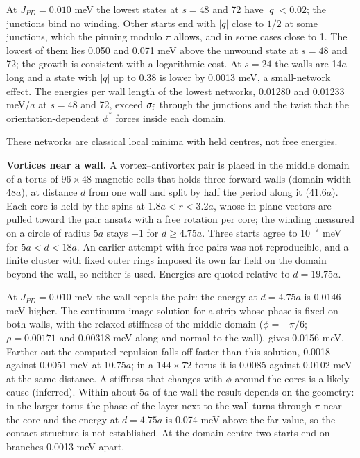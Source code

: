 At \(J_{PD}=0.010\) meV the lowest states at \(s=48\) and 72 have
\(|q|<0.02\); the junctions bind no winding. Other starts end with
\(|q|\) close to \(1/2\) at some junctions, which the pinning modulo
\(\pi\) allows, and in some cases close to 1. The lowest of them lies
0.050 and 0.071 meV above the unwound state at \(s=48\) and 72; the growth is
consistent with a logarithmic cost. At \(s=24\) the walls are 14\(a\)
long and a state with \(|q|\) up to 0.38 is lower by 0.0013 meV, a
small-network effect. The energies per wall length of the lowest
networks, 0.01280 and 0.01233 meV/\(a\) at \(s=48\) and 72, exceed
\(\sigma_{\rm f}\) through the junctions and the twist that the
orientation-dependent \(\phi^*\) forces inside each domain.

These networks are classical local minima with held centres, not free
energies.

\textbf{Vortices near a wall.} A vortex--antivortex pair is placed in
the middle domain of a torus of \(96\times48\) magnetic cells that holds
three forward walls (domain width \(48a\)), at distance \(d\) from one
wall and split by half the period along it (\(41.6a\)). Each core is
held by the spins at \(1.8a<r<3.2a\), whose in-plane vectors are pulled
toward the pair ansatz with a free rotation per core; the winding
measured on a circle of radius \(5a\) stays \(\pm1\) for
\(d\ge4.75a\). Three starts agree to \(10^{-7}\) meV for
\(5a<d<18a\). An earlier attempt with free pairs was not reproducible,
and a finite cluster with fixed outer rings imposed its own far field on
the domain beyond the wall, so neither is used. Energies are quoted
relative to \(d=19.75a\).

At \(J_{PD}=0.010\) meV the wall repels the pair: the energy at
\(d=4.75a\) is 0.0146 meV higher. The continuum image solution for a
strip whose phase is fixed on both walls, with the relaxed stiffness of
the middle domain (\(\phi=-\pi/6\); \(\rho=0.00171\) and 0.00318 meV
along and normal to the wall), gives 0.0156 meV. Farther out the
computed repulsion falls off faster than this solution, 0.0018 against
0.0051 meV at \(10.75a\); in a \(144\times72\) torus it is 0.0085
against 0.0102 meV at the same distance. A stiffness that changes with
\(\phi\) around the cores is a likely cause (inferred). Within about
\(5a\) of the wall the result depends on the geometry: in the larger
torus the phase of the layer next to the wall turns through \(\pi\) near
the core and the energy at \(d=4.75a\) is 0.074 meV above the far value,
so the contact structure is not established. At the domain centre two
starts end on branches 0.0013 meV apart.

